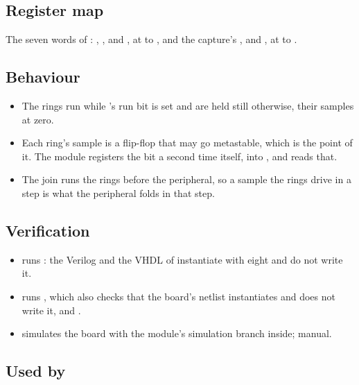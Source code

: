 \subsection*{Register map}

The seven words of : , ,
 and , at  to , and the
capture's ,  and , at
 to .


\subsection*{Behaviour}

\begin{itemize}
\item The rings run while 's run bit is set and are held
still otherwise, their samples at zero.
\item Each ring's sample is a flip-flop that may go metastable, which
is the point of it. The module registers the bit a second time
itself, into , and  reads that.
\item The join runs the rings before the peripheral, so a sample the
rings drive in a step is what the peripheral folds in that step.
\end{itemize}

\subsection*{Verification}

\begin{itemize}
\item {} runs
: the Verilog
and the VHDL of  instantiate  with
 eight and do not write it.
\item {} runs
, which also checks that
the board's netlist instantiates  and does not write
it, and .
\item {} simulates the board
with the module's simulation branch inside; manual.
\end{itemize}

\subsection*{Used by}

